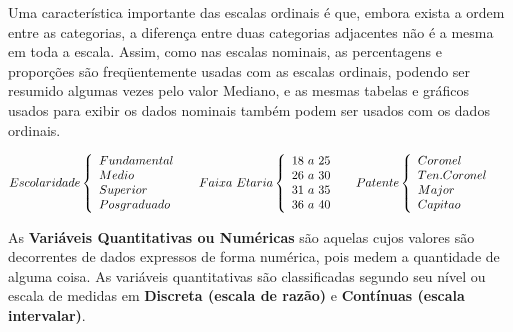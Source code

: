 \begin{enumerate}
Uma característica importante das escalas ordinais é que, embora exista a ordem entre as categorias, a diferença entre duas categorias adjacentes não é a mesma em toda a escala. Assim, como nas escalas nominais, as percentagens e proporções são freqüentemente usadas com as escalas ordinais, podendo ser resumido algumas vezes pelo valor Mediano, e as mesmas tabelas e gráficos usados para exibir os dados nominais também podem ser usados com os dados ordinais.
\end{enumerate}


$$
    Escolaridade
    \left\{
    \begin{array}{ll}
    Fundamental  & \hbox{ } \\
    Medio        & \hbox{ } \\
    Superior     & \hbox{ } \\
    Posgraduado  & \hbox{ }
    \end{array}
    \right.
    Faixa \ Etaria
    \left\{
    \begin{array}{ll}
    18 \ a \ 25   & \hbox{ } \\
    26 \ a \ 30   & \hbox{ } \\
    31 \ a \ 35   & \hbox{ } \\
    36 \ a \ 40    & \hbox{ }
    \end{array}
    \right.
    Patente
 \left\{
    \begin{array}{ll}
    Coronel        & \hbox{ } \\
    Ten. Coronel   & \hbox{ } \\
    Major          & \hbox{ } \\
    Capitao        & \hbox{ }
    \end{array}
    \right.
    $$



As \textbf{Variáveis Quantitativas ou Numéricas} são aquelas cujos valores são de\-cor\-ren\-tes de dados expressos de forma numérica, pois medem a quantidade de alguma coisa. As variáveis quantitativas são classificadas segundo seu nível ou escala de medidas em \textbf{Discreta (escala de razão)} e \textbf{Contínuas (escala intervalar)}.

